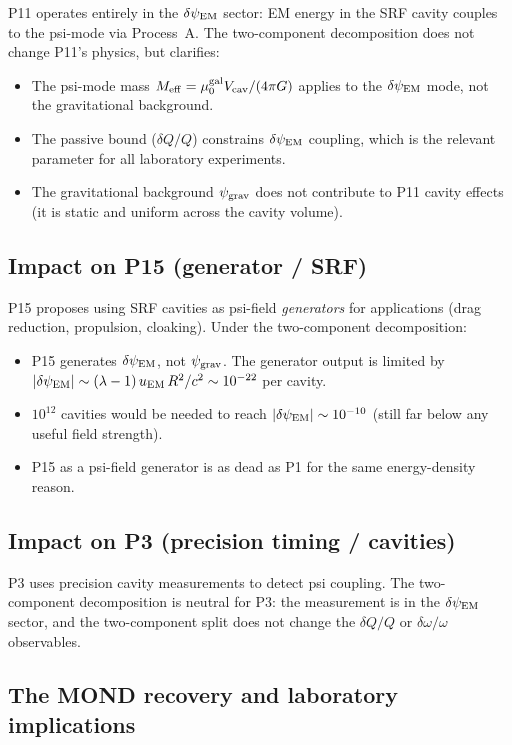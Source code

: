 \documentclass[11pt]{article}
\newcommand{\lam}{\lambda}
\newcommand{\Meff}{M_{\rm eff}}
\newcommand{\Vcav}{V_{\rm cav}}
\newcommand{\muG}{\mu_0^{\rm gal}}
\newcommand{\psigrav}{\psi_{\rm grav}}
\newcommand{\dpsiEM}{\delta\psi_{\rm EM}}
\theoremstyle{definition}
\theoremstyle{remark}
\begin{document}
P11 operates entirely in the $\dpsiEM$ sector: EM energy in the SRF
cavity couples to the psi-mode via Process~A. The two-component
decomposition does not change P11's physics, but clarifies:
\begin{itemize}[nosep]
\item The psi-mode mass $\Meff = \muG\Vcav/(4\pi G)$ applies to the
  $\dpsiEM$ mode, not the gravitational background.
\item The passive bound ($\delta Q/Q$) constrains $\dpsiEM$ coupling,
  which is the relevant parameter for all laboratory experiments.
\item The gravitational background $\psigrav$ does not contribute to
  P11 cavity effects (it is static and uniform across the cavity volume).
\end{itemize}

\subsection{Impact on P15 (generator / SRF)}
\label{ssec:P15_impact}

P15 proposes using SRF cavities as psi-field \emph{generators} for
applications (drag reduction, propulsion, cloaking). Under the
two-component decomposition:
\begin{itemize}[nosep]
\item P15 generates $\dpsiEM$, not $\psigrav$. The generator output is
  limited by $|\dpsiEM| \sim (\lam-1)\,u_{\rm EM}\,R^2/c^2 \sim 10^{-22}$
  per cavity.
\item $10^{12}$ cavities would be needed to reach $|\dpsiEM| \sim 10^{-10}$
  (still far below any useful field strength).
\item P15 as a psi-field generator is as dead as P1 for the same
  energy-density reason.
\end{itemize}

\subsection{Impact on P3 (precision timing / cavities)}
\label{ssec:P3_impact}

P3 uses precision cavity measurements to detect psi coupling. The
two-component decomposition is neutral for P3: the measurement is in
the $\dpsiEM$ sector, and the two-component split does not change the
$\delta Q/Q$ or $\delta\omega/\omega$ observables.

\subsection{The MOND recovery and laboratory implications}
\label{ssec:MOND_lab}
\end{document}
